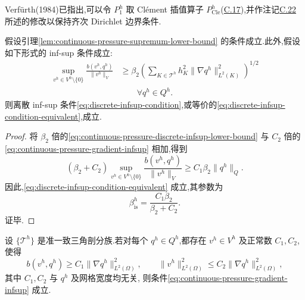 \begin{note}[算子 $P_1^h$ 的一种选择]\label{note:clement-as-p1}
Verfürth(1984)已指出,可以令 $P_1^h$ 取 Clément 插值算子 $P_{\mathrm{Cle}}^h$(\hyperref[eq:appendix-c-17]{C.17}),并作注记\hyperref[note:appendix-c-22]{C.22} 所述的修改以保持齐次 Dirichlet 边界条件.
\end{note}

\begin{theorem}\label{thm:verfurth-continuous-pressure}
假设引理\ref{lem:continuous-pressure-supremum-lower-bound} 的条件成立.此外,假设如下形式的 inf-sup 条件成立:
\begin{equation}\label{eq:continuous-pressure-gradient-infsup}
\begin{aligned}
  \sup_{v^h\in V^h\setminus\{0\}}
    \frac{b(v^h,q^h)}{\|v^h\|_V}
  &\ge \beta_2
       \left(\sum_{K\in\mathcal{T}^h}
          h_K^2\|\nabla q^h\|_{L^2(K)}^2\right)^{1/2}\\
  &\qquad\forall q^h\in Q^h.
\end{aligned}
\end{equation}
则离散 inf-sup 条件\cref{eq:discrete-infsup-condition},或等价的\cref{eq:discrete-infsup-condition-equivalent},成立.
\end{theorem}

\begin{proof}
将 $\beta_2$ 倍的\cref{eq:continuous-pressure-discrete-infsup-lower-bound} 与 $C_2$ 倍的\cref{eq:continuous-pressure-gradient-infsup} 相加,得到
\[
  (\beta_2+C_2)
  \sup_{v^h\in V^h\setminus\{0\}}
    \frac{b(v^h,q^h)}{\|v^h\|_V}
  \ge C_1\beta_2\|q^h\|_Q.
\]
因此,\cref{eq:discrete-infsup-condition-equivalent} 成立,其参数为
\[
  \beta_{\mathrm{is}}^h
  =\frac{C_1\beta_2}{\beta_2+C_2}.
\]
证毕.
\end{proof}

\begin{corollary}\label{cor:continuous-pressure-gradient-infsup}
设 $\{\mathcal{T}^h\}$ 是准一致三角剖分族.若对每个 $q^h\in Q^h$,都存在 $v^h\in V^h$ 及正常数 $C_1,C_2$,使得
\begin{equation}\label{eq:continuous-pressure-gradient-test}
  b(v^h,q^h)\ge C_1\|\nabla q^h\|_{L^2(\Omega)}^2,
  \qquad
  \|v^h\|_{L^2(\Omega)}^2
  \le C_2\|\nabla q^h\|_{L^2(\Omega)}^2,
\end{equation}
其中 $C_1,C_2$ 与 $q^h$ 及网格宽度均无关,
则条件\cref{eq:continuous-pressure-gradient-infsup} 成立.
\end{corollary}

